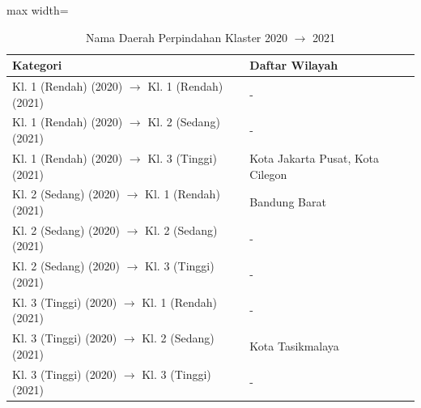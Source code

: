 \begin{table}[H]
\centering
\caption{Nama Daerah Perpindahan Klaster 2020 \(\rightarrow\) 2021} \label{tab:sampletransname2020x2021}
\begin{adjustbox}{max width=\textwidth}
\begin{tabular}{|p{4cm}|p{10cm}|}
\hline
\textbf{Kategori} & \textbf{Daftar Wilayah} \\
\hline
Kl. 1 (Rendah) (2020) \(\rightarrow\) Kl. 1 (Rendah) (2021) & - \\
\hline
Kl. 1 (Rendah) (2020) \(\rightarrow\) Kl. 2 (Sedang) (2021) & - \\
\hline
Kl. 1 (Rendah) (2020) \(\rightarrow\) Kl. 3 (Tinggi) (2021) & Kota Jakarta Pusat, Kota Cilegon \\
\hline
Kl. 2 (Sedang) (2020) \(\rightarrow\) Kl. 1 (Rendah) (2021) & Bandung Barat \\
\hline
Kl. 2 (Sedang) (2020) \(\rightarrow\) Kl. 2 (Sedang) (2021) & - \\
\hline
Kl. 2 (Sedang) (2020) \(\rightarrow\) Kl. 3 (Tinggi) (2021) & - \\
\hline
Kl. 3 (Tinggi) (2020) \(\rightarrow\) Kl. 1 (Rendah) (2021) & - \\
\hline
Kl. 3 (Tinggi) (2020) \(\rightarrow\) Kl. 2 (Sedang) (2021) & Kota Tasikmalaya \\
\hline
Kl. 3 (Tinggi) (2020) \(\rightarrow\) Kl. 3 (Tinggi) (2021) & - \\
\hline
\end{tabular}
\end{adjustbox}
\end{table}